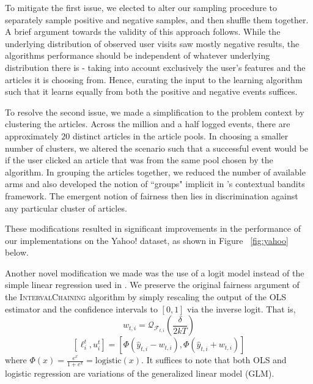\documentclass[11pt]{article}
\begin{document}
To mitigate the first issue, we elected to alter our sampling procedure to separately sample positive and negative samples, and then shuffle them together. A brief argument towards the validity of this approach follows. While the underlying distribution of observed user visits saw mostly negative results, the algorithms performance should be independent of whatever underlying distribution there is - taking into account exclusively the user's features and the articles it is choosing from. Hence, curating the input to the learning algorithm such that it learns equally from both the positive and negative events suffices.

To resolve the second issue, we made a simplification to the problem context by clustering the articles. Across the million and a half logged events, there are approximately $20$ distinct articles in the article pools. In choosing a smaller number of clusters, we altered the scenario such that a successful event would be if the user clicked an article that was from the same pool chosen by the algorithm. In grouping the articles together, we reduced the number of available arms and also developed the notion of ``groups" implicit in 's contextual bandits framework. The emergent notion of fairness then lies in discrimination against any particular cluster of articles.

These modifications resulted in significant improvements in the performance of our implementations on the Yahoo! dataset, as shown in Figure ~\ref{fig:yahoo} below.

Another novel modification we made was the use of a logit model instead of the simple linear regression used in . We preserve the original fairness argument of the \textsc{IntervalChaining} algorithm by simply rescaling the output of the OLS estimator and the confidence intervals to $[0, 1]$ via the inverse logit. That is,
$$w_{t,i} = \mathcal{Q}_{\mathcal{F}_{t,i}}(\frac{\delta}{2kT})$$
$$[\ell_{i}^{t}, u_{i}^{t}] = [\Phi(\hat{y}_{t,i} - w_{t,i}), \Phi(\hat{y}_{t,i} + w_{t,i})]$$
where $\Phi(x) = \frac{e^{x}}{1 + e^{x}} = \text{logistic}(x)$. It suffices to note that both OLS and logistic regression are variations of the generalized linear model (GLM).
\end{document}
